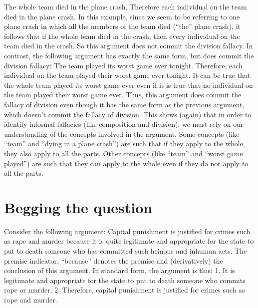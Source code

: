 The whole team died in the plane crash. Therefore each individual on the
team died in the plane crash.
In this example, since we seem to be referring to one plane crash in which all the
members of the team died (``the'' plane crash), it follows that if the whole team
died in the crash, then every individual on the team died in the crash. So this
argument does not commit the division fallacy. In contrast, the following
argument has exactly the same form, but does commit the division fallacy:
The team played its worst game ever tonight. Therefore, each individual
on the team played their worst game ever tonight.
It can be true that the whole team played its worst game ever even if it is true
that no individual on the team played their worst game ever. Thus, this
argument does commit the fallacy of division even though it has the same form
as the previous argument, which doesn't commit the fallacy of division. This
shows (again) that in order to identify informal fallacies (like composition and
division), we must rely on our understanding of the concepts involved in the
argument. Some concepts (like ``team'' and ``dying in a plane crash'') are such
that if they apply to the whole, they also apply to all the parts. Other concepts
(like ``team'' and ``worst game played'') are such that they can apply to the
whole even if they do not apply to all the parts.

\section{Begging the question}

Consider the following argument:
Capital punishment is justified for crimes such as rape and murder
because it is quite legitimate and appropriate for the state to put to
death someone who has committed such heinous and inhuman acts.
The premise indicator, ``because'' denotes the premise and (derivatively) the
conclusion of this argument. In standard form, the argument is this:
1. It is legitimate and appropriate for the state to put to death someone
who commits rape or murder.
2. Therefore, capital punishment is justified for crimes such as rape and
murder.


